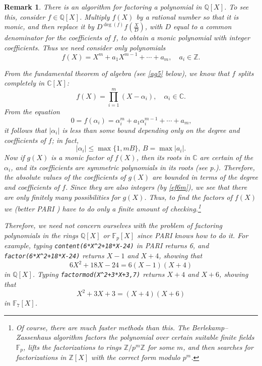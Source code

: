 \documentclass[a4paper,11pt,final,openany]{memoir}
\newtheorem{remark}[X]{Remark}
\theoremstyle{nonumberplain}
\begin{document}
\begin{remark}
\label{ef8}There is an algorithm%
for factoring a polynomial in $\mathbb{Q}[X]$. To see this, consider
$f\in\mathbb{Q}[X]$. Multiply $f(X)$ by a rational number so that it is monic,
and then replace it by $D^{\deg(f)}f(\frac{X}{D})$, with $D$ equal to a common
denominator for the coefficients of $f$, to obtain a monic polynomial with
integer coefficients. Thus we need consider only polynomials
\[
f(X)=X^{m}+a_{1}X^{m-1}+\cdots+a_{m},\quad a_{i}\in\mathbb{Z}.
\]


From the fundamental theorem of algebra%
(see \ref{ag5} below), we know that $f$ splits completely in $\mathbb{C}[X]$:
\[
f(X)=\prod_{i=1}^{m}(X-\alpha_{i}),\quad\alpha_{i}\in\mathbb{C}.
\]
From the equation
\[
0=f(\alpha_{i})=\alpha_{i}^{m}+a_{1}\alpha_{i}^{m-1}+\cdots+a_{m}\text{,}%
\]
it follows that $|\alpha_{i}|$ is less than some bound depending only on the
degree and coefficients of $f$; in fact,
\[
|\alpha_{i}|\leq\max\{1,mB\}\text{, }B=\max|a_{i}|\text{.}%
\]
Now if $g(X)$ is a monic factor of $f(X)$, then its roots in $\mathbb{C}$ are
certain of the $\alpha_{i}$, and its coefficients are symmetric polynomials in
its roots (see p.\thinspace\pageref{sympol}). Therefore, the absolute values
of the coefficients of $g(X)$ are bounded in terms of the degree and
coefficients of $f$. Since they are also integers (by \ref{ef6m}), we see that
there are only finitely many possibilities for $g(X)$. Thus, to find the
factors of $f(X)$ we (better PARI%
%
) have to do only a finite amount of checking.\footnote{Of course, there are
much faster methods than this. The Berlekamp--Zassenhaus algorithm factors the
polynomial over certain suitable finite fields $\mathbb{F}{}_{p}$, lifts the
factorizations to rings $\mathbb{Z}{}/p^{m}\mathbb{Z}$ for some $m$, and then
searches for factorizations in $\mathbb{Z}{}[X]$ with the correct form modulo
$p^{m}$.}

Therefore, we need not concern ourselves with the problem of factoring
polynomials in the rings $\mathbb{Q}[X]$ or $\mathbb{F}_{p}[X]$ since PARI%
knows how to do it. For example, typing \verb|content(6*X^2+18*X-24)| in PARI
returns 6, and \verb|factor(6*X^2+18*X-24)| returns $X-1$ and $X+4$, showing
that
\[
6X^{2}+18X-24=6(X-1)(X+4)
\]
in $\mathbb{Q}[X]$. Typing \verb|factormod(X^2+3*X+3,7)| returns $X+4$ and
$X+6$, showing that
\[
X^{2}+3X+3=(X+4)(X+6)
\]
in $\mathbb{F}_{7}[X]$.
\end{remark}
\end{document}
